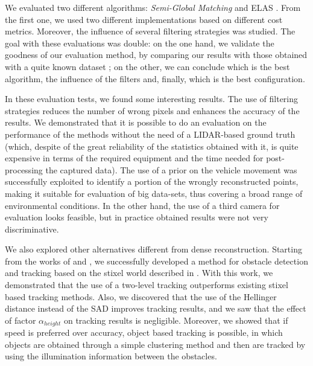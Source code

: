 We evaluated two different algorithms: \emph{Semi-Global Matching} \citep{Hirschmuller2005} and \ac{ELAS} \citep{Geiger2011}. From the first one, we used two different implementations based on different cost metrics. Moreover, the influence of several filtering strategies was studied. The goal with these evaluations was double: on the one hand, we validate the goodness of our evaluation method, by comparing our results with those obtained with a quite known dataset \citep{geiger2013vision}; on the other, we can conclude which is the best algorithm, the influence of the filters and, finally, which is the best configuration.

In these evaluation tests, we found some interesting results. The use of filtering strategies reduces the number of wrong pixels and enhances the accuracy of the results. We demonstrated that it is possible to do an evaluation on the performance of the methods without the need of a \ac{LIDAR}-based ground truth (which, despite of the great reliability of the statistics obtained with it, is quite expensive in terms of the required equipment and the time needed for post-processing the captured data). The use of a prior on the vehicle movement was successfully exploited to identify a portion of the wrongly reconstructed points, making it suitable for evaluation of big data-sets, thus covering a broad range of environmental conditions. In the other hand, the use of a third camera for evaluation looks feasible, but in practice obtained results were not very discriminative.

We also explored other alternatives different from dense reconstruction. Starting from the works of \cite{benenson2011stixels} and \cite{gunyel2012stixels}, we successfully developed a method for obstacle detection and tracking based on the stixel world described in \cite{badino2009stixel}. With this work, we demonstrated that the use of a two-level tracking outperforms existing stixel based tracking methods. Also, we discovered that the use of the Hellinger distance instead of the \acl{SAD} improves tracking results, and we saw that the effect of factor $\alpha_{height}$ on tracking results is negligible. Moreover, we showed that if speed is preferred over accuracy, object based tracking is possible, in which objects are obtained through a simple clustering method and then are tracked by using the illumination information between the obstacles.

